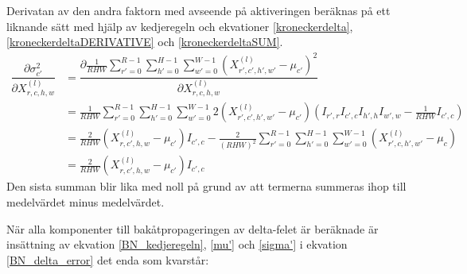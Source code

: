 \documentclass[a4paper,11pt,twoside]{article}
\newcommand*{\pd}[2]{\ensuremath{\dfrac{\partial #1}{\partial #2}}}
\begin{document}
Derivatan av den andra faktorn med avseende på aktiveringen beräknas på ett liknande sätt med hjälp av kedjeregeln och ekvationer \eqref{kroneckerdelta}, \eqref{kroneckerdeltaDERIVATIVE} och \eqref{kroneckerdeltaSUM}. \cite{webBN1} \cite{webBN2}
\begin{equation}\label{sigma'}
\begin{split}
\pd{\sigma^2_{c'}}{{X}^{(l)}_{r,c,h,w}}
	& = \pd{\frac{1}{RHW} \sum\limits^{R-1}_{r'=0} \sum\limits^{H-1}_{h'=0} \sum\limits^{W-1}_{w'=0} ({X^{(l)}_{r',c',h',w'} - \mu_{c'}})^2}{{X}^{(l)}_{r,c,h,w}} \\
	& = \frac{1}{RHW} \sum\limits^{R-1}_{r'=0} \sum\limits^{H-1}_{h'=0} \sum\limits^{W-1}_{w'=0} 2 ({X^{(l)}_{r',c',h',w'} - \mu_{c'}}) (I_{r',r} I_{c',c} I_{h',h} I_{w',w} - \frac{1}{RHW} I_{c',c}) \\
	& = \frac{2}{RHW} ({X^{(l)}_{r,c',h,w} - \mu_{c'}})I_{c',c} - \frac{2}{(RHW)^2}  \sum\limits^{R-1}_{r'=0} \sum\limits^{H-1}_{h'=0} \sum\limits^{W-1}_{w'=0} ({X^{(l)}_{r',c,h',w'} - \mu_{c}}) \\
	& = \frac{2}{RHW} ({X^{(l)}_{r,c',h,w} - \mu_{c'}})I_{c',c}
\end{split}
\end{equation}
Den sista summan blir lika med noll på grund av att termerna summeras ihop till medelvärdet minus medelvärdet. 

När alla komponenter till bakåtpropageringen av delta-felet är beräknade är insättning av ekvation \eqref{BN_kedjeregeln}, \eqref{mu'} och \eqref{sigma'} i ekvation \eqref{BN_delta_error} det enda som kvarstår:
\end{document}
